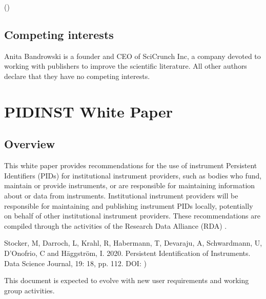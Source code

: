\documentclass[a4paper,10pt,english]{sphinxmanual}
\begin{document}
\sphinxAtStartPar
{} ()


\section*{Competing interests}
\label{\detokenize{white-paper/index:competing-interests}}
\sphinxAtStartPar
Anita Bandrowski is a founder and CEO of SciCrunch Inc, a company
devoted to working with publishers to improve the scientific
literature.  All other authors declare that they have no competing
interests.


\cleardoublepage
\sphinxtableofcontents
\pagestyle{normal}



\chapter{PIDINST White Paper}
\label{\detokenize{white-paper/index:pidinst-white-paper}}\label{\detokenize{white-paper/index:white-paper}}\label{\detokenize{white-paper/index::doc}}


\section{Overview}
\label{\detokenize{white-paper/overview:overview}}\label{\detokenize{white-paper/overview::doc}}
\sphinxAtStartPar
This white paper provides recommendations for the use of instrument
Persistent Identifiers (PIDs) for institutional instrument providers,
such as bodies who fund, maintain or provide instruments, or are
responsible for maintaining information about or data from instruments.
Institutional instrument providers will be responsible for maintaining
and publishing instrument PIDs locally, potentially on behalf of other
institutional instrument providers. These recommendations are compiled
through the activities of the Research Data Alliance (RDA) .%
\begin{footnote}[1]\sphinxAtStartFootnote
Stocker, M, Darroch, L, Krahl, R, Habermann, T, Devaraju, A,
Schwardmann, U, D’Onofrio, C and Häggström, I. 2020. Persistent
Identification of Instruments. Data Science Journal, 19: 18, pp.
1\textendash{}12. DOI: )
%
\end{footnote} This document is expected to evolve with
new user requirements and working group activities.
\end{document}

